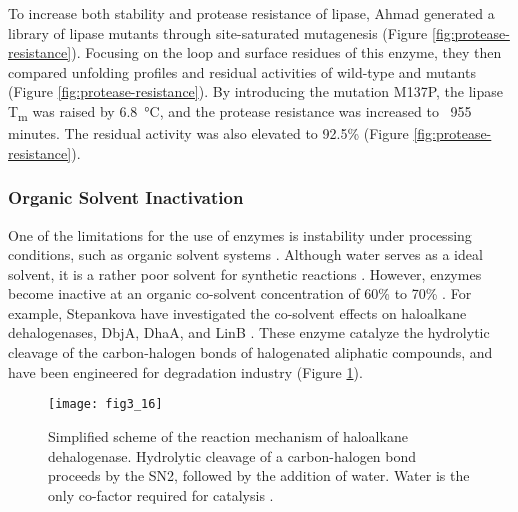 \begin{refsection}
To increase both stability and protease resistance of lipase, Ahmad 
generated a library of lipase mutants through site-saturated mutagenesis
(Figure \ref{fig:protease-resistance}).  Focusing on the loop and surface
residues of this enzyme, they then compared unfolding profiles and residual
activities of wild-type and mutants (Figure \ref{fig:protease-resistance}). By
introducing the mutation M137P, the lipase T\textsubscript{m} was raised by
\SI{6.8}{\celsius}, and the protease resistance was increased to ~955 minutes.
The residual activity was also elevated to 92.5\% \cite{Ahmad2012} (Figure
\ref{fig:protease-resistance}).

\subsubsection{Organic Solvent Inactivation}

One of the limitations for the use of enzymes is instability under processing
conditions, such as organic solvent systems \cite{Stepankova2013}.
Although water serves as a ideal solvent, it is a rather poor solvent for
synthetic reactions \cite{Serdakowski2008}. However, enzymes become inactive at
an organic co-solvent concentration of 60\% to 70\% \cite{Stepankova2013}. For
example, Stepankova  have investigated the co-solvent effects on
haloalkane dehalogenases, DbjA, DhaA, and LinB \cite{Koudelakova2013}. These
enzyme catalyze the hydrolytic cleavage of the carbon-halogen bonds of
halogenated aliphatic compounds, and have been engineered for degradation
industry \cite{Stepankova2013a,Koudelakova2013} (Figure \ref{fig:hld}).
\begin{figure}[htbp] \centering \texttt{[image: fig3\_16]} 
    \caption[Simplified scheme of the reaction mechanism of haloalkane
    dehalogenase. Hydrolytic cleavage of a carbon-halogen bond proceeds by the
SN2, followed by the addition of water. Water is the only co-factor required
for catalysis]{Simplified scheme of the reaction mechanism of haloalkane
    dehalogenase. Hydrolytic cleavage of a carbon-halogen bond proceeds by the
    SN2, followed by the addition of water. Water is the only co-factor
    required for catalysis \cite{Koudelakova2013}.} 
    \label{fig:hld}
\end{figure}


\end{refsection}

